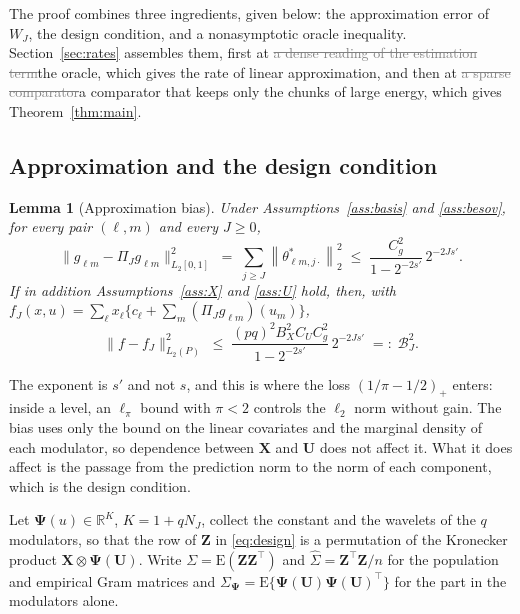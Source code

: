 \documentclass[12pt]{article} %
\newtheorem{lemma}{Lemma}
\theoremstyle{definition}
\theoremstyle{plain}
\newcommand{\R}{\mathbb{R}}
\newcommand{\E}{\mathrm{E}}
\newcommand{\T}{^{\top}}
\newcommand{\norm}[1]{\left\lVert #1 \right\rVert}
\newcommand{\cv}{\ell}
\newcommand{\md}{m}
\newcommand{\lev}{j}
\newcommand{\NJ}{N_{J}}
\newcommand{\bX}{\mathbf{X}}
\newcommand{\bU}{\mathbf{U}}
\newcommand{\bZ}{\mathbf{Z}}
\newcommand{\lvl}[1]{c_{#1}}
\newcommand{\gcomp}[2]{g_{#1#2}}
\newcommand{\WJ}{W_{J}}
\newcommand{\PiJ}{\Pi_{J}}
\newcommand{\Gram}{\Sigma}
\newcommand{\Gramhat}{\widehat{\Sigma}}
\newcommand{\seff}{s'}
\newcommand{\bPsi}{\boldsymbol{\Psi}}
\begin{document}
The proof combines three ingredients, given below: the approximation error of
\textcolor{colR1}{$\WJ$}, the design condition, and a nonasymptotic oracle inequality.
Section~\ref{sec:rates} assembles them, first at \textcolor{gray}{\sout{a dense reading of the
estimation term}}\textcolor{colR1}{the oracle}, which gives the \textcolor{colR1}{rate of linear approximation}, and then at \textcolor{gray}{\sout{a sparse comparator}}\textcolor{colR1}{a
comparator that keeps only the chunks of large energy},
which gives Theorem~\ref{thm:main}.

\subsection{Approximation and the design condition}
\label{sec:approx}

\begin{lemma}[\textcolor{colR1}{Approximation bias}]
\label{lem:bias}
Under Assumptions~\ref{ass:basis} and \ref{ass:besov}, for every pair
$(\cv,\md)$ and every $J \ge 0$,
\[
  \bigl\lVert \gcomp{\cv}{\md} - \PiJ\gcomp{\cv}{\md}
  \bigr\rVert_{L_2[0,1]}^{2}
  \;=\; \sum_{\lev \ge J}\norm{\theta^{*}_{\cv\md,\lev\cdot}}_{2}^{2}
  \;\le\; \frac{C_g^{2}}{1-2^{-2\seff}}\,2^{-2J\seff} .
\]
If in addition Assumptions~\ref{ass:X} and \ref{ass:U} hold, then, with
$f_J(x,u) = \sum_{\cv}x_{\cv}\{\lvl{\cv} +
\sum_{\md}(\PiJ\gcomp{\cv}{\md})(u_{\md})\}$,
\begin{equation}
  \label{eq:bias}
  \bigl\lVert f - f_J\bigr\rVert_{L_2(P)}^{2} \;\le\;
  \frac{(pq)^{2}B_X^{2}C_UC_g^{2}}{1-2^{-2\seff}}\,2^{-2J\seff}
  \;=:\; \mathcal{B}_{J}^{2} .
\end{equation}
\end{lemma}

The exponent is $\seff$ and not $s$, and this is where the loss
$(1/\pi-1/2)_{+}$ enters: inside a level, an $\ell_\pi$ bound with $\pi < 2$
controls the $\ell_2$ norm without gain. The bias uses only the bound on the
linear covariates and the marginal density of each modulator, so dependence
between $\bX$ and $\bU$ does not affect it. What it does affect is the passage
from the prediction norm to the norm of each component, which is the design
condition.

Let $\bPsi(u) \in \R^{K}$, $K = 1 + q\NJ$, collect the constant and the
wavelets of the $q$ modulators, so that the row of $\bZ$ in
\eqref{eq:design} is a permutation of the Kronecker product
$\bX \otimes \bPsi(\bU)$. Write $\Gram = \E(\bZ\bZ\T)$ and
$\Gramhat = \bZ\T\bZ/n$ for the population and empirical Gram matrices and
$\Gram_{\bPsi} = \E\{\bPsi(\bU)\bPsi(\bU)\T\}$ for the part in the modulators
alone.
\end{document}
